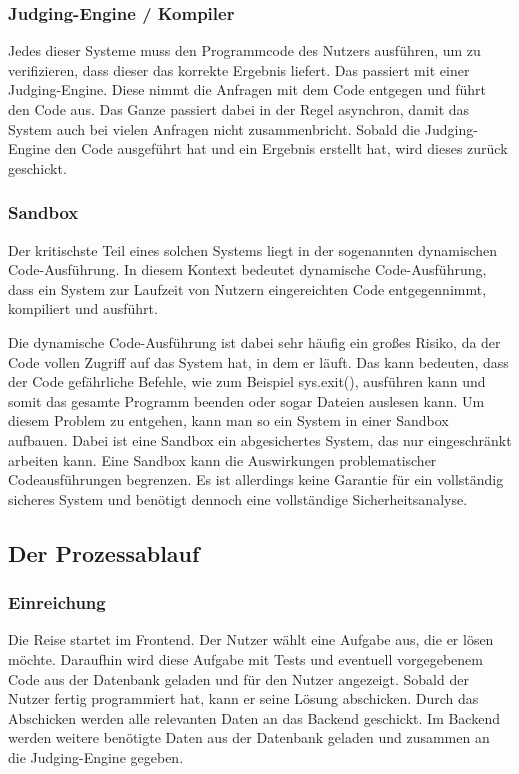 	\subsubsection{Judging-Engine / Kompiler}
	Jedes dieser Systeme muss den Programmcode des Nutzers ausführen, um zu verifizieren, dass dieser das korrekte Ergebnis liefert. Das passiert mit einer Judging-Engine. Diese nimmt die Anfragen mit dem Code entgegen und führt den Code aus. Das Ganze passiert dabei in der Regel asynchron, damit das System auch bei vielen Anfragen nicht zusammenbricht. Sobald die Judging-Engine den Code ausgeführt hat und ein Ergebnis erstellt hat, wird dieses zurück geschickt.
	\subsubsection{Sandbox}
	Der kritischste Teil eines solchen Systems liegt in der sogenannten dynamischen Code-Ausführung. In diesem Kontext bedeutet dynamische Code-Ausführung, dass ein System zur Laufzeit von Nutzern eingereichten Code entgegennimmt, kompiliert und ausführt.
	
	Die dynamische Code-Ausführung ist dabei sehr häufig ein großes Risiko, da der Code vollen Zugriff auf das System hat, in dem er läuft. Das kann bedeuten, dass der Code gefährliche Befehle, wie zum Beispiel sys.exit(), ausführen kann und somit das gesamte Programm beenden oder sogar Dateien auslesen kann.
	Um diesem Problem zu entgehen, kann man so ein System in einer Sandbox aufbauen. Dabei ist eine Sandbox ein abgesichertes System, das nur eingeschränkt arbeiten kann. Eine Sandbox kann die Auswirkungen problematischer Codeausführungen begrenzen. Es ist allerdings keine Garantie für ein vollständig sicheres System und benötigt dennoch eine vollständige Sicherheitsanalyse.

\subsection{Der Prozessablauf}
	\subsubsection{Einreichung}
	Die Reise startet im Frontend. Der Nutzer wählt eine Aufgabe aus, die er lösen möchte. Daraufhin wird diese Aufgabe mit Tests und eventuell vorgegebenem Code aus der Datenbank geladen und für den Nutzer angezeigt.
	Sobald der Nutzer fertig programmiert hat, kann er seine Lösung abschicken. Durch das Abschicken werden alle relevanten Daten an das Backend geschickt. Im Backend werden weitere benötigte Daten aus der Datenbank geladen und zusammen an die Judging-Engine gegeben.
	
